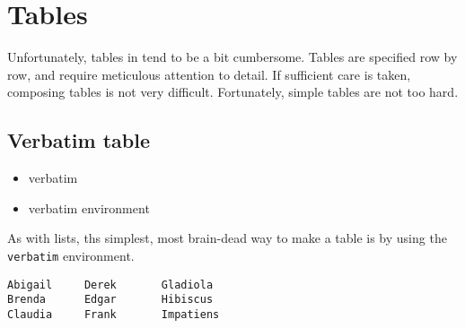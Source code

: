 	
	\section{Tables}
	\label{Tables}

        Unfortunately, tables in \Lx{} tend to be a bit cumbersome. Tables are specified row by row, and require meticulous attention to detail. If sufficient care is taken, composing tables is not very difficult. Fortunately, simple tables are not too hard. 
        
        \subsection{Verbatim table}
        \label{Verbatim table}
        
        \begin{framed}
            \begin{itemize}
                \item{verbatim}
                \item{verbatim environment}
            \end{itemize}
        \end{framed}

        As with lists, ths simplest, most brain-dead way to make a table is by using the \texttt{verbatim} environment.

        \begin{verbatim}
Abigail     Derek       Gladiola
Brenda      Edgar       Hibiscus
Claudia     Frank       Impatiens
        \end{verbatim}


